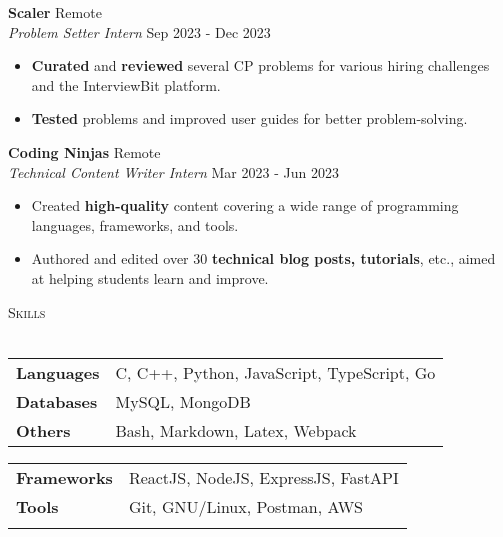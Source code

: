 \documentclass[a4paper]{article}
\newcommand{\bulletSep} { \vspace{1.5mm} }
\newcommand{\sectionSep} { \vspace{3mm} }
\newcommand{\lineunder} {
    \vspace*{-8pt} \\
    \hspace*{-15pt} \hrulefill \\
}
\newcommand{\header} [1] {
    {\hspace*{-18pt}\vspace*{6pt} {
        \fontfamily{qcs}\selectfont \large \scshape #1
    }}
    \vspace*{-6pt} \lineunder
    \vspace{1.1mm}
}
\newcommand{\experienceItem}[5]{
    \textbf{#1} \hfill #2 \\
    \textit{#3} \hfill #4 \\
    #5
}
\begin{document}
\experienceItem{Scaler}{Remote}{Problem Setter Intern}{Sep 2023 - Dec 2023}{
    \begin{itemize}
        \item \textbf{Curated} and \textbf{reviewed} several CP problems for various hiring challenges and the InterviewBit platform.
        \item \textbf{Tested} problems and improved user guides for better problem-solving.
    \end{itemize}
}
\bulletSep

\experienceItem{Coding Ninjas}{Remote}{Technical Content Writer Intern}{Mar 2023 - Jun 2023}{
    \begin{itemize}
        \item Created \textbf{high-quality} content covering a wide range of programming languages, frameworks, and tools.
        \item Authored and edited over 30 \textbf{technical blog posts, tutorials}, etc., aimed at helping students learn and improve.
    \end{itemize}
}

\sectionSep


\header{Skills}
\begin{minipage}[t]{0.51\textwidth}
    \begin{tabular}{@{}ll}
        \textbf{Languages} & C, C++, Python, JavaScript, TypeScript, Go \\
        \textbf{Databases} & MySQL, MongoDB                             \\
        \textbf{Others}    & Bash, Markdown, Latex, Webpack
    \end{tabular}
\end{minipage}
\hfill
\begin{minipage}[t]{0.47\textwidth}
    \begin{tabular}{@{}ll}
        \textbf{Frameworks} & ReactJS, NodeJS, ExpressJS, FastAPI \\
        \textbf{Tools}      & Git, GNU/Linux, Postman, AWS        \\
        \textbf{}           &                                     \\
    \end{tabular}
\end{minipage}
\sectionSep
\end{document}

